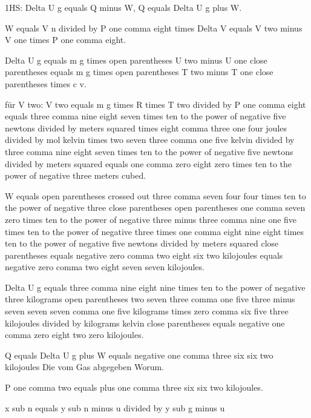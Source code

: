 1HS: Delta U g equals Q minus W, Q equals Delta U g plus W.

W equals V n divided by P one comma eight times Delta V equals V two minus V one times P one comma eight.

Delta U g equals m g times open parentheses U two minus U one close parentheses equals m g times open parentheses T two minus T one close parentheses times c v.

für V two: V two equals m g times R times T two divided by P one comma eight equals three comma nine eight seven times ten to the power of negative five newtons divided by meters squared times eight comma three one four joules divided by mol kelvin times two seven three comma one five kelvin divided by three comma nine eight seven times ten to the power of negative five newtons divided by meters squared equals one comma zero eight zero times ten to the power of negative three meters cubed.

W equals open parentheses crossed out three comma seven four four times ten to the power of negative three close parentheses open parentheses one comma seven zero times ten to the power of negative three minus three comma nine one five times ten to the power of negative three times one comma eight nine eight times ten to the power of negative five newtons divided by meters squared close parentheses equals negative zero comma two eight six two kilojoules equals negative zero comma two eight seven seven kilojoules.

Delta U g equals three comma nine eight nine times ten to the power of negative three kilograms open parentheses two seven three comma one five three minus seven seven seven comma one five kilograms times zero comma six five three kilojoules divided by kilograms kelvin close parentheses equals negative one comma zero eight two zero kilojoules.

Q equals Delta U g plus W equals negative one comma three six six two kilojoules Die vom Gas abgegeben Worum.

P one comma two equals plus one comma three six six two kilojoules.

x sub n equals y sub n minus u divided by y sub g minus u